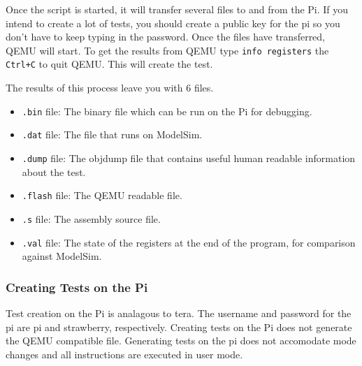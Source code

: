 Once the script is started, it will transfer several files to and from the Pi. If you intend to create a lot of tests, you should create a public key for the pi so you don't have to keep typing in the password. Once the files have transferred, QEMU will start. To get the results from QEMU type \texttt{info registers} the \texttt{Ctrl+C} to quit QEMU. This will create the test. 

The results of this process leave you with 6 files. 
\begin{itemize}
\item \texttt{.bin} file: The binary file which can be run on the Pi for debugging. 
\item \texttt{.dat} file: The file that runs on ModelSim. 
\item \texttt{.dump} file: The objdump file that contains useful human readable information about the test.
\item \texttt{.flash} file: The QEMU readable file. 
\item \texttt{.s} file: The assembly source file.
\item \texttt{.val} file: The state of the registers at the end of the program, for comparison against ModelSim. 
\end{itemize}

\subsubsection{Creating Tests on the Pi}
Test creation on the Pi is analagous to tera. 
The username and password for the pi are pi and strawberry, respectively. Creating tests on the Pi does not generate the QEMU compatible file. Generating tests on the pi does not accomodate mode changes and all instructions are executed in user mode. 

